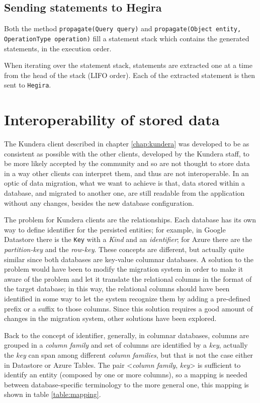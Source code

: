 \subsection{Sending statements to Hegira}
Both the method \texttt{propagate(Query query)} and \texttt{propagate(Object entity, OperationType operation)} fill a statement stack which contains the generated statements, in the execution order.

\noindent When iterating over the statement stack, statements are extracted one at a time from the head of the stack (LIFO order). Each of the extracted statement is then sent to \texttt{Hegira}.


\section{Interoperability of stored data}
\label{sec:data-interoperability}
The Kundera client described in chapter \ref{chap:kundera} was developed to be as consistent as possible with the other clients, developed by the Kundera staff, to be more likely accepted by the community and so are not thought to store data in a way other clients can interpret them, and thus are not interoperable.
In an optic of data migration, what we want to achieve is that, data stored within a database, and migrated to another one, are still readable from the application without any changes, besides the new database configuration. 

\noindent The problem for Kundera clients are the relationships. Each database has its own way to define identifier for the persisted entities; for example, in Google Datastore there is the \texttt{Key} with a \textit{Kind} and an \textit{identifier}; for Azure there are the \textit{partition-key} and the \textit{row-key}. These concepts are different, but actually quite similar since both databases are key-value columnar databases. 
A solution to the problem would have been to modify the migration system in order to make it aware of the problem and let it translate the relational columns in the format of the target database; in this way, the relational columns should have been identified in some way to let the system recognize them by adding a pre-defined prefix or a suffix to those columns.
Since this solution requires a good amount of changes in the migration system, other solutions have been explored.
 
\newparagraph Back to the concept of identifier, generally, in columnar databases, columns are grouped in a \textit{column family} and set of columns are identified by a \textit{key}, actually the \textit{key} can span among different \textit{column families}, but that is not the case either in Datastore or Azure Tables.
The pair \textless\textit{column family}, \textit{key}\textgreater
is sufficient to identify an entity (composed by one or more columns), so a mapping is needed between database-specific terminology to the more general one, this mapping is shown in table \ref{table:mapping}.

